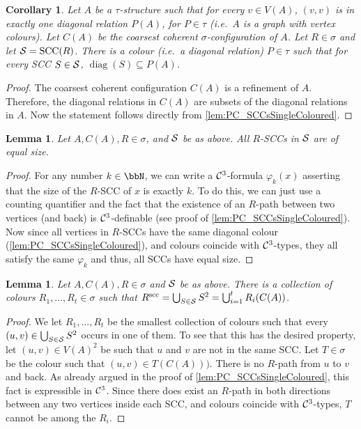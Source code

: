 \documentclass[10pt,a4paper]{article}
\newtheorem{lemma}[theorem]{Lemma}
\newtheorem{corollary}[theorem]{Corollary}
\renewcommand{\phi}{\varphi}
\renewcommand{\phi}{\varphi}
\newcommand{\Cc}{{\cal C}}
\newcommand{\Ss}{{\cal S}}
\newcommand{\scc}{{\operatorname{scc}}}
\newcommand{\sccs}{{\operatorname{SCC}}}
\newcommand{\diag}{{\operatorname{diag}}}
\begin{document}
	
	\begin{corollary}
		\label{cor:PC_SCCsSingleVertexColoured}
		Let $A$ be a $\tau$-structure such that for every $v \in V(A)$, $(v,v)$ is in exactly one diagonal relation $P(A)$, for $P \in \tau$ (i.e.\ $A$ is a graph with vertex colours).
		Let $C(A)$ be the coarsest coherent $\sigma$-configuration of $A$. Let $R \in \sigma$ and let $\Ss = \sccs(R)$. There is a colour (i.e.\ a diagonal relation) $P \in \tau$ such that for every SCC $S \in \Ss$, $\diag(S) \subseteq P(A)$.
	\end{corollary}	
	\begin{proof}
		The coarsest coherent configuration $C(A)$ is a refinement of $A$. Therefore, the diagonal relations in $C(A)$ are subsets of the diagonal relations in $A$. Now the statement follows directly from \autoref{lem:PC_SCCsSingleColoured}.
	\end{proof}
	
	
	
	\begin{lemma}
		\label{lem:PC_SCCequalSize}
		Let $A,C(A), R \in \sigma$, and $\Ss$ be as above. All $R$-SCCs in $\Ss$ are of equal size.
	\end{lemma}
	\begin{proof}
		For any number $k \in \bbN$, we can write a $\Cc^3$-formula $\phi_k(x)$ asserting that the size of the $R$-SCC of $x$ is exactly $k$. To do this, we can just use a counting quantifier and the fact that the existence of an $R$-path between two vertices (and back) is $\Cc^3$-definable (see proof of \autoref{lem:PC_SCCsSingleColoured}). Now since all vertices in $R$-SCCs have the same diagonal colour (\autoref{lem:PC_SCCsSingleColoured}), and colours coincide with $\Cc^3$-types, they all satisfy the same $\phi_k$ and thus, all SCCs have equal size.
	\end{proof}
	
	\begin{lemma}
		\label{lem:PC_differentColours}
		Let $A,C(A), R \in \sigma$ and $\Ss$ be as above.
		There is a collection of colours $R_1,...,R_t \in \sigma$ such that $R^\scc = \bigcup_{S \in \Ss} S^2 = \bigcup_{i =1}^t R_i(C(A))$.
	\end{lemma}
	\begin{proof}
		We let $R_1,...,R_t$ be the smallest collection of colours such that every $(u,v) \in \bigcup_{S \in \Ss} S^2$ occurs in one of them. To see that this has the desired property, let $(u,v) \in V(A)^2$ be such that $u$ and $v$ are not in the same SCC. 
		Let $T \in \sigma$ be the colour such that $(u,v) \in T(C(A)))$. There is no $R$-path from $u$ to $v$ and back. As already argued in the proof of \autoref{lem:PC_SCCsSingleColoured}, this fact is expressible in $\Cc^3$. Since there does exist an $R$-path in both directions between any two vertices inside each SCC, and colours coincide with $\Cc^3$-types, $T$ cannot be among the $R_i$.
	\end{proof}
	
\end{document}
